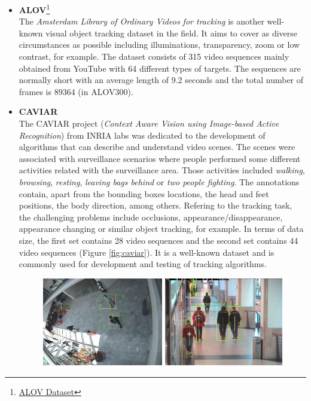 \begin{itemize}
\begin{figure}[H]
\begin{center}
\label{fig:mot}
\end{center}
\end{figure}
\item \textbf{ALOV}\footnote{{\href{http://alov300pp.joomlafree.it/dataset-resources.html}{ALOV Dataset}}}\\
The \textit{Amsterdam Library of Ordinary Videos for tracking} is another well-known visual object tracking dataset in the field. It aims to cover as diverse circumstances as possible including illuminations, transparency, zoom or low contrast, for example. The dataset consists of 315 video sequences mainly obtained from YouTube with 64 different types of targets. The sequences are normally short with an average length of 9.2 seconds and the total number of frames is 89364 (in ALOV300).
\item \textbf{CAVIAR} \cite{dubuisson2016survey}\\
The CAVIAR project (\textit{Context Aware Vision using Image-based Active Recognition}) from INRIA labs was dedicated to the development of algorithms that can describe and understand video scenes. The scenes were associated with surveillance scenarios where people performed some different activities related with the surveillance area. Those activities included \textit{walking}, \textit{browsing}, \textit{resting}, \textit{leaving bags behind} or \textit{two people fighting}. The annotations contain, apart from the bounding boxes locations, the head and feet positions, the body direction, among others. Refering to the tracking task, the challenging problems include occlusions, appearance/disappearance, appearance changing or similar object tracking, for example. In terms of data size, the first set contains 28 video sequences and the second set contains 44 video sequences (Figure \ref{fig:caviar}). It is a well-known dataset and is commonly used for development and testing of tracking algorithms.
\begin{figure}[H]
\begin{center}
\includegraphics[scale=0.3]{previous_version/caviar.png}

\end{center}
\end{figure}
\end{itemize}
